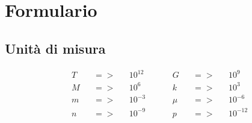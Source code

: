 \section{Formulario}
	\subsection{Unità di misura}
		\begin{align*}
			& T && => && 10^{12}&&   && G && => && 10^{9}\\
			& M && => && 10^{6}&&   && k && => && 10^{3}\\
			& m && => && 10^{-3}&&   && \mu && => && 10^{-6}\\
			& n && => && 10^{-9}&&   && p && => && 10^{-12}\\
		\end{align*}
	